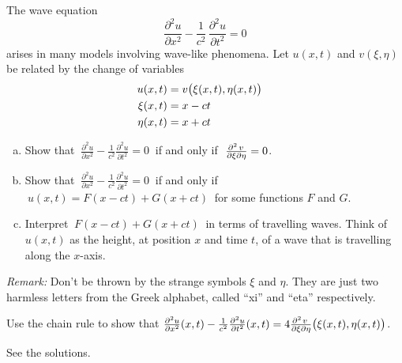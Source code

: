 \subsection*{\Application}

\begin{question}
 The wave equation
\begin{equation*}
\frac{\partial^2u}{\partial x^2}
   -\frac{1}{c^2}\,\frac{\partial^2u}{\partial t^2}
=0
\end{equation*}
arises in many models involving wave-like phenomena. Let $u(x,t)$ and 
$v(\xi,\eta)$ be related by the change of variables
\begin{align*}
u(x,t)&=v\big(\xi(x,t),\eta(x,t)\big)\cr
\xi(x,t)&=x-ct\cr
\eta(x,t)&=x+ct
\end{align*}


\begin{enumerate}[(a)]
\item
Show that 
$\ \frac{\partial^2u}{\partial x^2}
       -\frac{1}{c^2}\frac{\partial^2u}{\partial t^2}
=0\ $ 
if and only if
$\ \frac{\partial^2\hfil v\hfil}{\partial\xi\partial\eta}=0$.
\item
Show that 
$\ \frac{\partial^2u}{\partial x^2}
       -\frac{1}{c^2}\frac{\partial^2u}{\partial t^2}
=0\ $ 
if and only if 
$\ u(x,t)=F(x-ct)+G(x+ct)\ $ for some functions $F$ and $G$.
\item
Interpret $\ F(x-ct)+G(x+ct)\ $ in terms of travelling waves. 
Think of $u(x,t)$ as the height, at position $x$ and time $t$, of a wave 
    that is travelling along the $x$-axis. 
\end{enumerate}

\textit{Remark:} Don't be thrown by the strange symbols $\xi$ and $\eta$.
          They are just two harmless letters from the Greek alphabet, called
          ``xi'' and ``eta'' respectively.
\end{question}

\begin{hint}
Use the chain rule to show that
$\frac{\partial^2 u}{\partial x^2}(x,t)
-\frac{1}{c^2}\frac{\partial^2 u}{\partial t^2}(x,t)
=4\frac{\partial^2\hfil v\hfil\,}{\partial\xi\partial\eta}
      \big(\xi(x,t),\eta(x,t)\big)$.
\end{hint}

\begin{answer}
See the solutions.
\end{answer}

